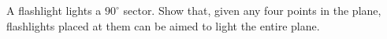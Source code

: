 A flashlight lights a $90^\circ$ sector. Show that, given any four points in the plane, flashlights placed at them can be aimed to light the entire plane.
